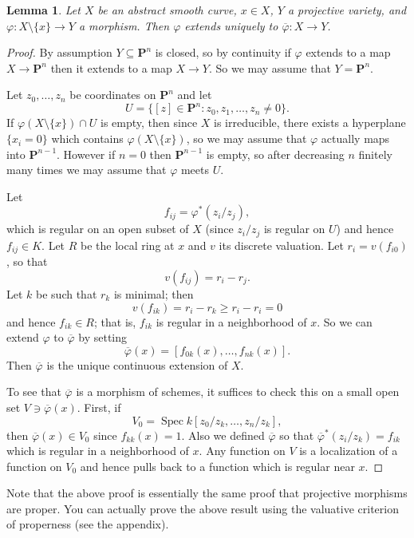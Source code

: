 \documentclass[reqno,12pt,letterpaper]{amsart}
\newcommand{\PP}{\mathbf P}
\DeclareMathOperator{\Spec}{Spec}
\newtheorem{lemma}[theorem]{Lemma}
\theoremstyle{definition}
\begin{document}
\begin{lemma}
Let $X$ be an abstract smooth curve, $x \in X$, $Y$ a projective variety, and $\varphi: X \setminus \{x\} \to Y$ a morphism.
Then $\varphi$ extends uniquely to $\overline \varphi: X \to Y$.
\end{lemma}
\begin{proof}
By assumption $Y \subseteq \PP^n$ is closed, so by continuity if $\varphi$ extends to a map $X \to \PP^n$ then it extends to a map $X \to Y$.
So we may assume that $Y = \PP^n$.

Let $z_0, \dots, z_n$ be coordinates on $\PP^n$ and let
$$U = \{[z] \in \PP^n: z_0, z_1, \dots, z_n \neq 0\}.$$
If $\varphi(X \setminus \{x\}) \cap U$ is empty, then since $X$ is irreducible, there exists a hyperplane $\{x_i = 0\}$ which contains $\varphi(X \setminus \{x\})$, so we may assume that $\varphi$ actually maps into $\PP^{n - 1}$.
However if $n = 0$ then $\PP^{n - 1}$ is empty, so after decreasing $n$ finitely many times we may assume that $\varphi$ meets $U$.

Let
$$f_{ij} = \varphi^*(z_i/z_j),$$
which is regular on an open subset of $X$ (since $z_i/z_j$ is regular on $U$) and hence $f_{ij} \in K$.
Let $R$ be the local ring at $x$ and $v$ its discrete valuation.
Let $r_i = v(f_{i0})$, so that
$$v(f_{ij}) = r_i - r_j.$$
Let $k$ be such that $r_k$ is minimal; then
$$v(f_{ik}) = r_i - r_k \geq r_i - r_i = 0$$
and hence $f_{ik} \in R$; that is, $f_{ik}$ is regular in a neighborhood of $x$.
So we can extend $\varphi$ to $\overline \varphi$ by setting
$$\overline \varphi(x) = [f_{0k}(x), \dots, f_{nk}(x)].$$
Then $\overline \varphi$ is the unique continuous extension of $X$.

To see that $\overline \varphi$ is a morphism of schemes, it suffices to check this on a small open set $V \ni \overline \varphi(x)$.
First, if
$$V_0 = \Spec k[z_0/z_k, \dots, z_n/z_k],$$
then $\overline \varphi(x) \in V_0$ since $f_{kk}(x) = 1$.
Also we defined $\overline \varphi$ so that $\overline \varphi^*(z_i/z_k) = f_{ik}$ which is regular in a neighborhood of $x$.
Any function on $V$ is a localization of a function on $V_0$ and hence pulls back to a function which is regular near $x$.
\end{proof}

Note that the above proof is essentially the same proof that projective morphisms are proper.
You can actually prove the above result using the valuative criterion of properness (see the appendix).
\end{document}
